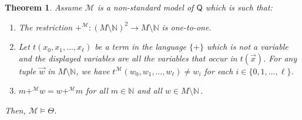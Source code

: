 \documentclass[10pt,a4paper, openany,  oldfontcommands]{memoir}
\newtheorem{theorem}{Theorem}
\newtheorem{open problem} [theorem] {Open Problem}
\newtheorem{open question} [theorem] {Open Question}
\begin{document}
\begin{theorem} \label{SectionQTreeModelTheorem}
Assume  $  \mathcal{M}  $ is a non-standard model of  $  \mathsf{Q} $  which is such that:
\begin{enumerate}
\item The restriction   $ +^{  \mathcal{M}  }  :     \left( M  \setminus  \mathbb{N} \right)^2  \to    M  \setminus  \mathbb{N} $
is  one-to-one. 

\item   Let   $ t ( x_0, x_1,  \ldots , x_{  \ell  }  ) $ be a term   in the language  $  \lbrace + \rbrace $  which is not a variable and  the displayed variables are all the variables that occur in     $ t ( \vec{x} ) $. 
For any tuple  $    \vec{w}  $ in $  M  \setminus  \mathbb{N} $,   we have 
$ t^{  \mathcal{M}  } ( w_0, w_1,  \ldots , w_{ \ell } )   \neq  w_i $  for each  $ i  \in  \lbrace 0, 1,  \ldots ,  \ell  \rbrace $. 


\item   $  m  +^{  \mathcal{M}  }  w  =  w   +^{  \mathcal{M}  }   m  $   
for  all  $  m \in  \mathbb{N} $  and  all    $ w  \in M \setminus  \mathbb{N}   \,  $. 
\end{enumerate}
Then,  $   \mathcal{M}     \models  \Theta   $.
\end{theorem}
\end{document}
